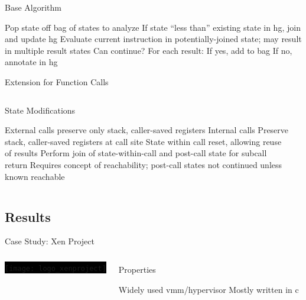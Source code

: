\begin{frame}{Base Algorithm}
  \begin{outline}[enumerate]
    \1 Pop state off \gls{bag} of states to analyze
    \1 If state \alert{``less than''} existing state in \gls{hg}, join and update \gls{hg}
    \1 Evaluate current instruction in potentially-joined state; may result in multiple result states
    \1 Can continue? For each result:
      \2 If yes, add to bag
      \2 If no, annotate in \gls{hg}
  \end{outline}
\end{frame}

\begin{frame}{Extension for Function Calls}
  \begin{columns}
    \begin{block}{State Modifications}
      \begin{outline}
        \1 External calls preserve only stack, \alert{caller-saved} registers
        \1 Internal calls
          \2 Preserve stack, \alert{caller-saved} registers at call site
          \2 State within call reset, allowing reuse of results
          \2 Perform join of state-within-call and post-call state for subcall return
        \1 Requires concept of \alert{reachability}; post-call states not continued unless known reachable
      \end{outline}
    \end{block}

    \begin{example}
    \end{example}
  \end{columns}
\end{frame}


\subsection{Results}

\begin{frame}{Case Study: Xen Project}
  \begin{columns}
    \colorbox{black}{\texttt{[image: logo\_xenproject]}}

    \begin{block}{Properties}
      \begin{outline}
        \1 Widely used \gls{vmm}/hypervisor
        \1 Mostly written in \gls{c}
      \end{outline}
    \end{block}
  \end{columns}
\end{frame}

